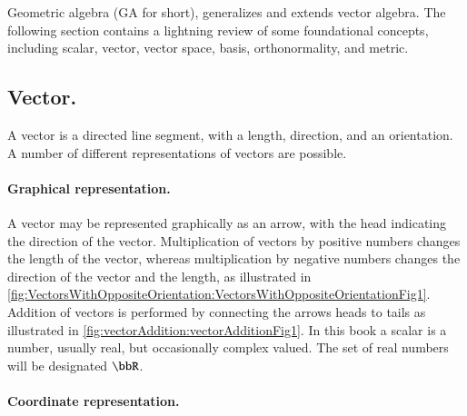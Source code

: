 %
%
Geometric algebra (GA for short), generalizes and extends vector algebra.
The following section contains a lightning review of some
foundational concepts, including
scalar, vector, vector space, basis, orthonormality, and metric.

\subsection{Vector.}

A vector is a directed line segment, with a length, direction, and an orientation.  A number of different representations of vectors are possible.

\paragraph{Graphical representation.}

A vector may be represented graphically as an arrow, with the head indicating the direction of the vector.
Multiplication of vectors by positive numbers changes the length of the vector, whereas multiplication by negative numbers changes the direction of the vector and the length, as illustrated in
\cref{fig:VectorsWithOppositeOrientation:VectorsWithOppositeOrientationFig1}.
Addition of vectors is performed by connecting the arrows heads to tails as illustrated in
\cref{fig:vectorAddition:vectorAdditionFig1}.
\index{\(\bbR\)}
In this book a scalar is a number, usually real, but occasionally complex valued.  The set of real numbers will be designated \(\bbR\).

\paragraph{Coordinate representation.}

